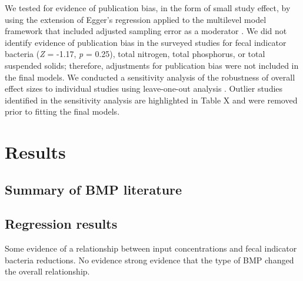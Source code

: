 \documentclass[utf8]{FrontiersinHarvard}
\begin{document}
We tested for evidence of publication bias, in the form of small study
effect, by using the extension of Egger's regression applied to the
multilevel model framework that included adjusted sampling error as a
moderator \citep{nakagawaQuantitativeEvidenceSynthesis2023}. We did not
identify evidence of publication bias in the surveyed studies for fecal
indicator bacteria (\emph{Z} = -1.17, \emph{p} = 0.25), total nitrogen,
total phosphorus, or total suspended solids; therefore, adjustments for
publication bias were not included in the final models. We conducted a
sensitivity analysis of the robustness of overall effect sizes to
individual studies using leave-one-out analysis
\citep{nakagawaQuantitativeEvidenceSynthesis2023}. Outlier studies
identified in the sensitivity analysis are highlighted in Table X and
were removed prior to fitting the final models.

\hypertarget{results}{%
\section{Results}\label{results}}

\hypertarget{summary-of-bmp-literature}{%
\subsection{Summary of BMP literature}\label{summary-of-bmp-literature}}

\hypertarget{regression-results}{%
\subsection{Regression results}\label{regression-results}}

Some evidence of a relationship between input concentrations and fecal
indicator bacteria reductions. No evidence strong evidence that the type
of BMP changed the overall relationship.
\end{document}
